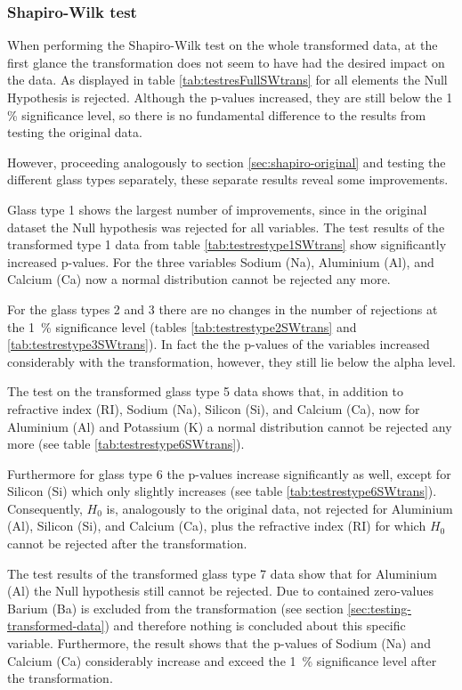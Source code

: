 \documentclass[a4paper, 12pt, titlepage, headsepline, listof = totoc, bibliography = totoc, numbers = noenddot]{scrartcl}
\begin{document}
\subsubsection{Shapiro-Wilk test}\label{sec:shapiro-transformed}

When performing the Shapiro-Wilk test on the whole transformed data, at the first glance the transformation does not seem to have had the desired impact on the data. As displayed in table \ref{tab:testresFullSWtrans} for all elements the Null Hypothesis is rejected. Although the p-values increased, they are still below the 1\, \% significance level, so there is no fundamental difference to the results from testing the original data.

However, proceeding analogously to section \ref{sec:shapiro-original} and testing the different glass types separately, these separate results reveal some improvements.

Glass type 1 shows the largest number of improvements, since in the original dataset the Null hypothesis was rejected for all variables. The test results of the transformed type 1 data from table \ref{tab:testrestype1SWtrans} show significantly increased p-values. For the three variables Sodium (Na), Aluminium (Al), and Calcium (Ca) now a normal distribution cannot be rejected any more.

For the glass types 2 and 3 there are no changes in the number of rejections at the 1\, \% significance level (tables \ref{tab:testrestype2SWtrans} and \ref{tab:testrestype3SWtrans}). In fact the the p-values of the variables increased considerably with the transformation, however, they still lie below the alpha level.

The test on the transformed glass type 5 data shows that, in addition to refractive index (RI), Sodium (Na), Silicon (Si), and Calcium (Ca), now for Aluminium (Al) and Potassium (K) a normal distribution cannot be rejected any more (see table \ref{tab:testrestype6SWtrans}).

Furthermore for glass type 6 the p-values increase significantly as well, except for Silicon (Si) which only slightly increases (see table \ref{tab:testrestype6SWtrans}). Consequently, $H_0$ is, analogously to the original data, not rejected for Aluminium (Al), Silicon (Si), and Calcium (Ca), plus the refractive index (RI) for which $H_0$ cannot be rejected after the transformation.

The test results of the transformed glass type 7 data show that for Aluminium (Al) the Null hypothesis still cannot be rejected. Due to contained zero-values Barium (Ba) is excluded from the transformation (see section \ref{sec:testing-transformed-data}) and therefore nothing is concluded about this specific variable. Furthermore, the result shows that the p-values of Sodium (Na) and Calcium (Ca) considerably increase and exceed the 1\, \% significance level after the transformation.
\end{document}
